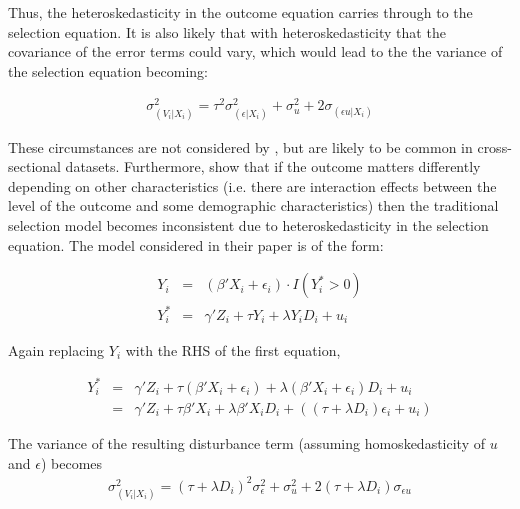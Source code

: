 \documentclass{article}
\begin{document}
\noindent Thus, the heteroskedasticity in the outcome equation carries through to the selection equation.  It is also likely that with heteroskedasticity that the covariance of the error terms could vary, which would lead to the the variance of the selection equation becoming:

\begin{eqnarray*}
\sigma_{(V_i|X_i)}^2=\tau^2\sigma_{(\epsilon|X_i)}^2 +\sigma_{u}^2 + 2\sigma_{(\epsilon u | X_i)}
\end{eqnarray*}

These circumstances are not considered by \citet{reichert2014}, but are likely to be common in cross-sectional datasets.  Furthermore, \citet{reichert2014} show that if the outcome matters differently depending on other characteristics (i.e. there are interaction effects between the level of the outcome and some demographic characteristics) then the traditional selection model becomes inconsistent due to heteroskedasticity in the selection equation.  The model considered in their paper is of the form:

\begin{eqnarray*}
Y_i&=&(\beta'X_i + \epsilon_i)\cdot I(Y^*_i>0) \\
Y^*_i&=&\gamma'Z_i +\tau Y_i +\lambda Y_iD_i + u_i
\end{eqnarray*}

\noindent Again replacing $Y_i$ with the RHS of the first equation,

\begin{eqnarray*}
Y^*_i&=&\gamma'Z_i +\tau(\beta'X_i + \epsilon_i) + \lambda (\beta'X_i + \epsilon_i)D_i + u_i \\
     &=&\gamma'Z_i +\tau\beta'X_i + \lambda\beta'X_iD_i+((\tau+\lambda D_i)\epsilon_i + u_i)
\end{eqnarray*}

\noindent The variance of the resulting disturbance term (assuming homoskedasticity of $u$ and $\epsilon$) becomes
\begin{eqnarray*}
\sigma_{(V_i|X_i)}^2=(\tau+\lambda D_i)^2\sigma_{\epsilon}^2 +\sigma_{u}^2 + 2(\tau+\lambda D_i)\sigma_{\epsilon u}
\end{eqnarray*}


\end{document}
